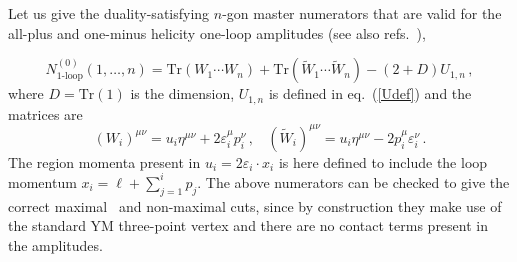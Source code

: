 \documentclass[11pt,a4paper]{article}
\def\eqn#1{eq.~(\ref{#1})}
\begin{document}
Let us give the duality-satisfying $n$-gon master numerators that are valid for the all-plus and one-minus helicity one-loop amplitudes (see also refs.~\cite{Boels:2013bi,Edison:2022jln}),
\iffalse
\begin{equation}
    N^{(0)}_{\textrm{1-loop}}(1,\ldots,n) = \textrm{Tr}(W_1\cdots W_n) - 2\tilde{U}_{1,n}\, ,
\end{equation}
where 
\begin{equation}
    \tilde{U}_{1,n} = (-1)^{n+1}(\varepsilon_{1}{\cdot} x_{1} )\cdots (\varepsilon_{n}{\cdot} x_{n} )\, ,
\end{equation}
and 
\begin{equation}
    (W_i)^{\mu\nu} = 
    \varepsilon_i^\nu(x_i+p_i)^\mu - 
    \varepsilon_i^\mu(p_i-x_{i-1})^\nu  - \eta^{\mu\nu}\varepsilon_i{\cdot}(x_i+x_{i-1})
    \, .
\end{equation}
\fi
%
\begin{equation}
    N^{(0)}_{\textrm{1-loop}}(1,\ldots,n) = \textrm{Tr}(W_1\cdots W_n)+ \textrm{Tr}(\widetilde W_1\cdots \widetilde W_n) - (2+D)U_{1,n}\, ,
\end{equation}
where $D=\textrm{Tr}(1)$ is the dimension, $U_{1,n}$ is defined in \eqn{Udef} and the matrices are
\begin{equation}
    (W_i)^{\mu\nu} = u_i \eta^{\mu\nu}+ 
    2 \varepsilon_i^\mu p_i^\nu 
    \,,~~~~
    (\widetilde W_i)^{\mu\nu} = u_i \eta^{\mu\nu}- 
    2 p_i^\mu \varepsilon_i^\nu 
    \, .
\end{equation}
The region momenta present in $u_i=2\varepsilon_i{\cdot} x_i$ is here defined to include the loop momentum $x_i = \ell+ \sum_{j=1}^{i}p_j$.
The above numerators can be checked to give the correct maximal~\cite{Edison:2022jln} and non-maximal cuts, since by construction they make use of the standard YM three-point vertex and there are no contact terms present in the amplitudes.
\end{document}
